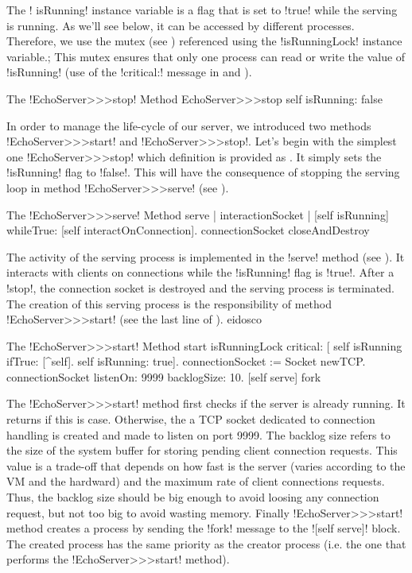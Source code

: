 \documentclass[a4paper,10pt,twoside]{book}
\begin{document}
The \ct! isRunning! instance variable is a flag that is set to \ct!true! while the serving is running.
As we'll see below, it can be accessed by different processes.
Therefore, we use the mutex (see ) referenced using the \ct!isRunningLock! instance variable.;
This mutex ensures that only one process can read or write the value of \ct!isRunning! (use of the \ct!critical:! message in  and ).

\begin{method}{The \ct!EchoServer>>>stop! Method}
EchoServer>>>stop
	self isRunning: false
\end{method}

In order to manage the life-cycle of our server, we introduced two methods \ct!EchoServer>>>start! and \ct!EchoServer>>>stop!.
Let's begin with the simplest one \ct!EchoServer>>>stop! which definition is provided as .
It simply sets the \ct!isRunning! flag to \ct!false!.
This will have the consequence of stopping the serving loop in method \ct!EchoServer>>>serve! (see ). 

\begin{method}{The \ct!EchoServer>>>serve! Method}
serve
	| interactionSocket |
	[self isRunning] whileTrue: [self interactOnConnection].
	connectionSocket closeAndDestroy
\end{method}

The activity of the serving process is implemented in the \ct!serve! method (see ).
It interacts with clients on connections while the \ct!isRunning! flag is \ct!true!.
After a \ct!stop!, the connection socket is destroyed and the serving process is terminated. 
The creation of this serving process is the responsibility of method \ct!EchoServer>>>start! (see the last line of ).
eidosco
\begin{method}{The \ct!EchoServer>>>start! Method}
start
	isRunningLock critical: [
		self isRunning ifTrue: [^self].
		self isRunning: true].
	connectionSocket := Socket newTCP.
	connectionSocket listenOn: 9999 backlogSize: 10.
	[self serve] fork
\end{method}

The \ct!EchoServer>>>start! method first checks if the server is already running.
It returns if this is case.
Otherwise, the a TCP socket dedicated to connection handling is created and made to listen on port 9999.
The backlog size refers to the size of the system buffer for storing pending client connection requests.
This value is a trade-off that depends on how fast is the server (varies according to the VM and the hardward) and the maximum rate of client connections requests.
Thus, the backlog size should be big enough to avoid loosing any connection request, but not too big to avoid wasting memory.
Finally \ct!EchoServer>>>start! method creates a process by sending the \ct!fork! message to the \ct![self serve]! block.
The created process has the same priority as the creator process (i.e. the one that performs the \ct!EchoServer>>>start! method).
\end{document}
